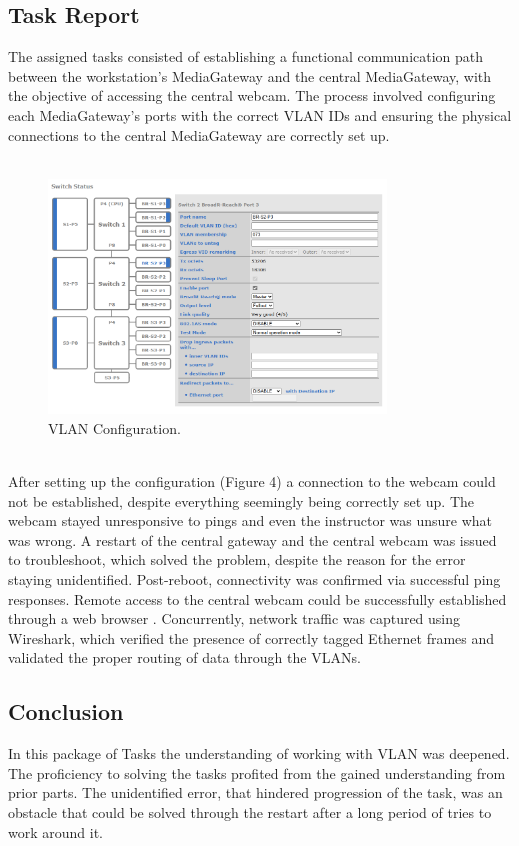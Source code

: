 \subsection{Task Report}
The assigned tasks consisted of establishing a functional communication path between the workstation’s MediaGateway and the central MediaGateway, with the objective of accessing the central webcam. The process involved configuring each MediaGateway’s ports with the correct VLAN IDs and ensuring the physical connections to the central MediaGateway are correctly set up. \\\\
\begin{figure}[h]
    \centering
     \includegraphics[width=0.8\textwidth]{figures/pictures/vlanconfig2.png}
    \caption{VLAN Configuration.}
    \label{fig:mediagateway_setup4}
\end{figure}\\ After setting up the configuration (Figure 4) a connection to the webcam could not be established, despite everything seemingly being correctly set up. The webcam stayed unresponsive to pings and even the instructor was unsure what was wrong. A restart of the central gateway and the central webcam was issued to troubleshoot, which solved the problem, despite the reason for the error staying unidentified. Post-reboot, connectivity was confirmed via successful ping responses. Remote access to the central webcam could be successfully established through a web browser . Concurrently, network traffic was captured using Wireshark, which verified the presence of correctly tagged Ethernet frames and validated the proper routing of data through the VLANs. 

\subsection{Conclusion}
In this package of Tasks the understanding of working with VLAN was deepened. The proficiency to solving the tasks profited from the gained understanding from prior parts. The unidentified error, that hindered progression of the task, was an obstacle that could be solved through the restart after a long period of tries to work around it.


